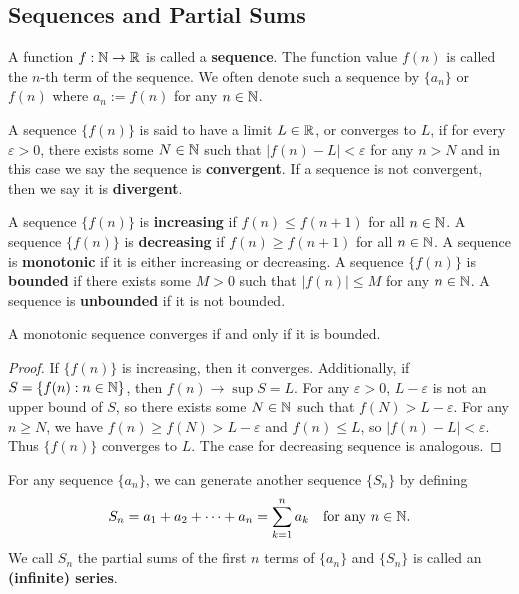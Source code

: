 \documentclass[a4paper]{ctexart}
\begin{document}
    \subsection{Sequences and Partial Sums}
    \begin{mydef}
        A function $f:\mathbb{N} \to \mathbb{R}$ is called a \textbf{sequence}. The function value $f(n)$ is called the $n$-th term of the sequence. We often denote such a sequence by $\{a_n\}$ or $f(n)$ where $a_n := f(n)$ for any $n\in \mathbb{N}$.
    \end{mydef}
    \begin{mydef}
        A sequence $\{f(n)\}$ is said to have a limit $L\in \mathbb{R}$, or converges to $L$, if for every $\varepsilon > 0$, there exists some $N\in \mathbb{N}$ such that $|f(n) - L| < \varepsilon$ for any $n > N$ and in this case we say the sequence is \textbf{convergent}. If a sequence is not convergent, then we say it is \textbf{divergent}.
    \end{mydef}
    \begin{mydef}
        A sequence $\{f(n)\}$ is \textbf{increasing} if $f(n) \le f(n+1)$ for all $n\in \mathbb{N}$. A sequence $\{f(n)\}$ is \textbf{decreasing} if $f(n) \ge f(n+1)$ for all $n\in \mathbb{N}$. A sequence is \textbf{monotonic} if it is either increasing or decreasing. A sequence $\{f(n)\}$ is \textbf{bounded} if there exists some $M>0$ such that $|f(n)| \le M$ for any $n\in \mathbb{N}$. A sequence is \textbf{unbounded} if it is not bounded.
    \end{mydef}
    \begin{mythm}
        A monotonic sequence converges if and only if it is bounded.
    \end{mythm}
    \begin{proof}
        If $\{f(n)\}$ is increasing, then it converges. Additionally, if $S = \{f(n):n\in \mathbb{N}\}$, then $f(n) \to \sup S = L$. For any $\varepsilon > 0$, $L-\varepsilon$ is not an upper bound of $S$, so there exists some $N\in \mathbb{N}$ such that $f(N) > L-\varepsilon$. For any $n\ge N$, we have $f(n) \ge f(N) > L-\varepsilon$ and $f(n) \le L$, so $|f(n) - L| < \varepsilon$. Thus $\{f(n)\}$ converges to $L$. The case for decreasing sequence is analogous.
    \end{proof}
    \begin{mydef}
        For any sequence $\{a_n\}$, we can generate another sequence $\{S_n\}$ by defining
        \[
        S_n = a_1 + a_2 + \cdots + a_n = \sum_{k=1}^n a_k \quad \text{for any } n\in \mathbb{N}.
        \]
        We call $S_n$ the partial sums of the first $n$ terms of $\{a_n\}$ and $\{S_n\}$ is called an \textbf{(infinite) series}.
    \end{mydef}
\end{document}
